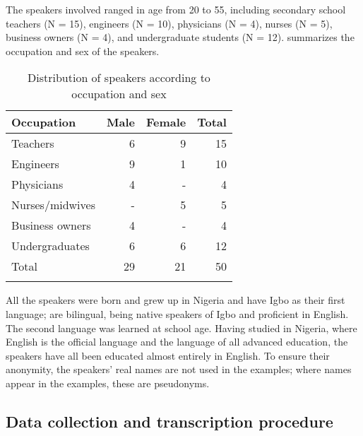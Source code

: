 \documentclass[output=paper]{langsci/langscibook}
\begin{document}
The speakers involved ranged in age from 20 to 55, including secondary school teachers (N = 15), engineers (N = 10), physicians (N = 4), nurses (N = 5), business owners (N = 4), and undergraduate students (N = 12).  summarizes the occupation and sex of the speakers. 
 
\begin{table}
\caption{Distribution of speakers according to occupation and sex}
\label{tab:1}

\begin{tabularx}{.66\textwidth}{Xrrr}
\lsptoprule
Occupation & Male & Female & Total\\
\midrule
Teachers & 6 & 9 & 15\\
Engineers & 9 & 1 & 10\\
Physicians & 4 & - & 4\\
Nurses/midwives & - & 5 & 5\\
Business owners & 4 & - & 4\\
Undergraduates & 6 & 6 & 12\\
\midrule
Total & 29 & 21 & 50\\
\lspbottomrule
\end{tabularx}

\end{table} 

All the speakers were born and grew up in Nigeria and have Igbo as their first language; are bilingual, being native speakers of Igbo and proficient in English. The second language was learned at school age. Having studied in Nigeria, where English is the official language and the language of all advanced education, the speakers have all been educated almost entirely in English. To ensure their anonymity, the speakers’ real names are not used in the examples; where names appear in the examples, these are pseudonyms.

\subsection{Data collection and transcription procedure}
\end{document}
